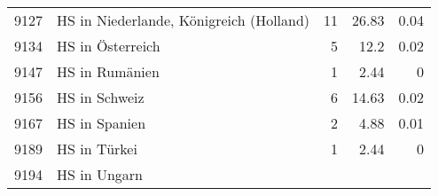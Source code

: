 \begin{longtable}{lXrrr}
     9127 &
     \multicolumn{1}{X}{ HS in Niederlande, Königreich (Holland)   } &


       \num{11} &
       \num[round-mode=places,round-precision=2]{26.83} &
         \num[round-mode=places,round-precision=2]{0.04} \\

     9134 &
     \multicolumn{1}{X}{ HS in Österreich   } &


       \num{5} &
       \num[round-mode=places,round-precision=2]{12.2} &
         \num[round-mode=places,round-precision=2]{0.02} \\

     9147 &
     \multicolumn{1}{X}{ HS in Rumänien   } &


       \num{1} &
       \num[round-mode=places,round-precision=2]{2.44} &
         \num[round-mode=places,round-precision=2]{0} \\

     9156 &
     \multicolumn{1}{X}{ HS in Schweiz   } &


       \num{6} &
       \num[round-mode=places,round-precision=2]{14.63} &
         \num[round-mode=places,round-precision=2]{0.02} \\

     9167 &
     \multicolumn{1}{X}{ HS in Spanien   } &


       \num{2} &
       \num[round-mode=places,round-precision=2]{4.88} &
         \num[round-mode=places,round-precision=2]{0.01} \\

     9189 &
     \multicolumn{1}{X}{ HS in Türkei   } &


       \num{1} &
       \num[round-mode=places,round-precision=2]{2.44} &
         \num[round-mode=places,round-precision=2]{0} \\

     9194 &
     \multicolumn{1}{X}{ HS in Ungarn   } &



\end{longtable}
